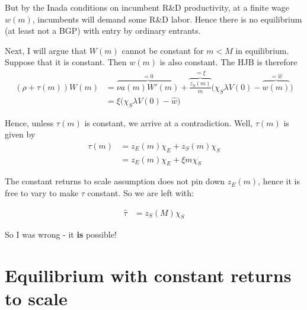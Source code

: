 \documentclass[11pt,english]{article}
\theoremstyle{remark}
\begin{document}
But by the Inada conditions on incumbent R\&D productivity, at a finite wage $w(m)$, incumbents will demand some R\&D labor. Hence there is no equilibrium (at least not a BGP) with entry by ordinary entrants. 

Next, I will argue that $W(m)$ cannot be constant for $m < M$ in equilibrium. Suppose that it is constant. Then $w(m)$ is also constant. The HJB is therefore
\begin{align*}
	(\rho + \tau(m)) W(m) &= \overbrace{\nu a(m) W'(m)}^{= 0}+ \overbrace{\frac{z_S(m)}{m}}^{= \xi} \Big( \chi_S  \lambda V(0) - \overbrace{w(m)}^{=\hat{w}} \Big) \\
	                      &= \xi \Big( \chi_S \lambda V(0) - \hat{w} \Big)
\end{align*}

Hence, unless $\tau(m)$ is constant, we arrive at a contradiction. Well, $\tau(m)$ is given by 
\begin{align*}
	\tau(m) &= z_E(m)\chi_E + z_S(m) \chi_S  \\
	        &= z_E(m) \chi_E + \xi m \chi_S
\end{align*}

The constant returns to scale assumption does not pin down $z_E(m)$, hence it is free to vary to make $\tau$ constant. So we are left with:

\begin{align*}
	\hat{\tau} &= z_S(M) \chi_S 
\end{align*}

So I was wrong - it \textbf{is} possible!

\section{Equilibrium with constant returns to scale}
\end{document}
